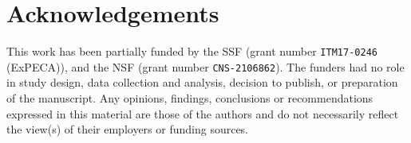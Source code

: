 \section*{Acknowledgements}\label{sec:acks}

This work has been partially funded by the \ac{SSF} (grant number \verb|ITM17-0246| (ExPECA)), and the \ac{NSF} (grant number \verb|CNS-2106862|).
The funders had no role in study design, data collection and analysis, decision to publish, or preparation of the manuscript.
Any opinions, findings, conclusions or recommendations expressed in this material are those of the authors and do not necessarily reflect the view(s) of their employers or funding sources.